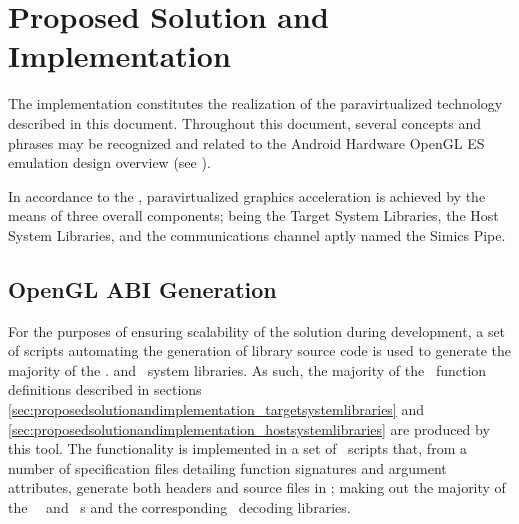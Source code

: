 
\chapter{Proposed Solution and Implementation}
\label{cha:proposedsolutionandimplementation}
The implementation constitutes the realization of the paravirtualized technology described in this document.
Throughout this document, several concepts and phrases may be recognized and related to the Android Hardware OpenGL ES emulation design overview (see ).

In accordance to the \dvttermreferencesolution , paravirtualized graphics acceleration is achieved by the means of three overall components; being the Target System Libraries, the Host System Libraries, and the communications channel aptly named the Simics Pipe.



\section{OpenGL ABI Generation}
\label{sec:proposedsolutionandimplementation_openglabigeneration}
For the purposes of ensuring scalability of the solution during development, a set of scripts automating the generation of library source code is used to generate the majority of the \dvttermtarget . and \dvttermhost\ system libraries.
As such, the majority of the \dvttermopengl\ function definitions described in sections \ref{sec:proposedsolutionandimplementation_targetsystemlibraries} and \ref{sec:proposedsolutionandimplementation_hostsystemlibraries} are produced by this tool.
The functionality is implemented in a set of \dvttermpython\ scripts that, from a number of specification files detailing function signatures and argument attributes, generate both headers and source files in \dvttermc ; making out the majority of the \dvttermtarget\ \dvttermopengl\ and \dvttermegl\ \dvttermabi s and the corresponding \dvttermhost\ decoding libraries.


